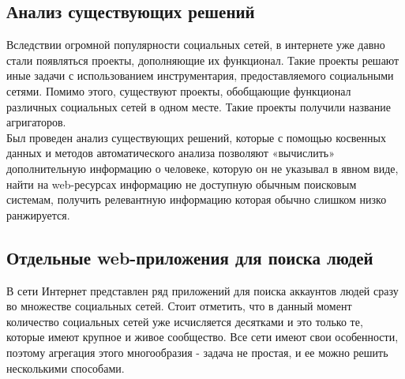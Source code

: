 \begin{chapter1}
\section{Анализ существующих решений}
Вследствии огромной популярности социальных сетей, в интернете уже давно стали появляться проекты, дополняющие их функционал. Такие проекты решают иные задачи с использованием инструментария, предоставляемого социальными сетями. Помимо этого, существуют проекты, обобщающие функционал различных социальных сетей в одном месте. Такие проекты получили название агригаторов.\\

Был проведен анализ существующих решений, которые с помощью косвенных данных и методов автоматического анализа позволяют «вычислить» дополнительную информацию о человеке, которую он не указывал в явном виде, найти на web-ресурсах информацию не доступную обычным поисковым системам, получить релевантную информацию которая обычно слишком низко ранжируется.
\subsection{Отдельные web-приложения для поиска людей}
В сети Интернет представлен ряд приложений для поиска аккаунтов людей сразу во множестве социальных сетей. Стоит отметить, что в данный момент количество социальных сетей уже исчисляется десятками и это только те, которые имеют крупное и живое сообщество. Все сети имеют свои особенности,  поэтому агрегация этого многообразия - задача не простая, и ее можно решить несколькими способами.
\end{chapter1}
